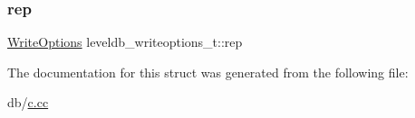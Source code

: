 \subsubsection{\texorpdfstring{rep}{rep}}
{\footnotesize\ttfamily \mbox{\hyperlink{structleveldb_1_1_write_options}{Write\+Options}} leveldb\+\_\+writeoptions\+\_\+t\+::rep}



The documentation for this struct was generated from the following file\+:\begin{DoxyCompactItemize}
\item 
db/\mbox{\hyperlink{c_8cc}{c.\+cc}}\end{DoxyCompactItemize}
